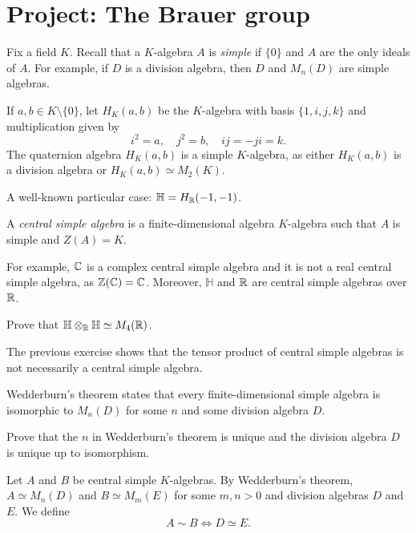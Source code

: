 \section*{Project: The Brauer group}

Fix a field $K$. Recall that a $K$-algebra $A$ is \emph{simple} 
if $\{0\}$ and $A$ are the only ideals of $A$. 
For example, if $D$ is a division algebra, then $D$ and $M_n(D)$ are simple algebras. 

\begin{example}
    If $a,b\in K\setminus\{0\}$, let $H_K(a,b)$ be the $K$-algebra 
    with basis $\{1,i,j,k\}$ and multiplication given by
    \[
    i^2=a,\quad
    j^2=b,\quad 
    ij=-ji=k.
    \]
    The quaternion algebra $H_K(a,b)$ is a simple $K$-algebra, as either $H_K(a,b)$ is a division algebra
    or $H_K(a,b)\simeq M_2(K)$. 
\end{example}

A well-known particular case: $\mathbb{H}=H_{\mathbb{R}}(-1,-1)$. 

\begin{definition}
    A \emph{central simple algebra} is a finite-dimensional algebra $K$-algebra
    such that $A$ is simple and $Z(A)=K$.
\end{definition}

For example, $\mathbb{C}$ is a complex central simple algebra and
it is not a real central simple algebra, as $\mathbb{Z}(\mathbb{C})=\mathbb{C}$. Moreover, 
$\mathbb{H}$ and $\mathbb{R}$ are central simple algebras over $\mathbb{R}$.  

\begin{exercise}
    Prove that $\mathbb{H}\otimes_{\mathbb{R}}\mathbb{H}\simeq M_4(\mathbb{R})$.  
\end{exercise}

The previous exercise shows that the tensor product of central simple algebras is not 
necessarily a central simple algebra. 

Wedderburn's theorem states that every finite-dimensional 
simple algebra is isomorphic to $M_n(D)$ 
for some $n$ and some division algebra $D$. 

\begin{exercise}
    Prove that the $n$ in Wedderburn's theorem is unique and
    the division algebra $D$ is unique up to isomorphism. 
\end{exercise}

Let $A$ and $B$ be central simple $K$-algebras. By Wedderburn's theorem, 
$A\simeq M_n(D)$ and $B\simeq M_m(E)$ for some $m,n>0$ and 
division algebras $D$ and $E$. We define 
\[
    A\sim B\Longleftrightarrow D\simeq E.
\]

